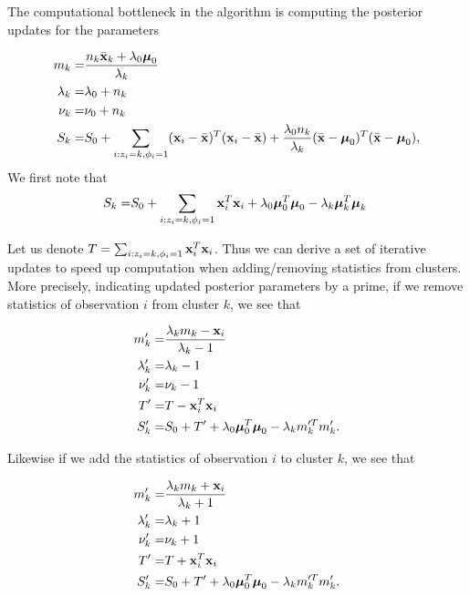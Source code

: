 \documentclass[12pt,english]{article}\usepackage[]{graphicx}\usepackage[]{color}
\begin{document}
The computational bottleneck in the algorithm is computing the
posterior updates for the parameters

\begin{equation}
\begin{split}
m_k = & \frac{n_k\bar{{\bf x}}_k + \lambda_0 \boldsymbol{\mu}_0}{\lambda_k}\\
\lambda_k = & \lambda_0 + n_k\\
\nu_k = & \nu_0 + n_k \\
S_k = & S_0 + \sum_{i:z_i = k, \phi_i = 1}({\bf x}_i - \bar{{\bf x}})^{T}({\bf x}_i - \bar{{\bf x}}) + \frac{\lambda_0n_k}{\lambda_k}(\bar{{\bf x}}- \boldsymbol{\mu}_0)^T(\bar{{\bf x}} - \boldsymbol{\mu}_0), \\
\end{split}
\end{equation}
We first note that
\begin{equation}
\begin{split}
S_k = & S_0 + \sum_{i:z_i = k, \phi_i = 1}{\bf x}_i^{T}{\bf x}_i + \lambda_0\boldsymbol{\mu}_0^T\boldsymbol{\mu}_0 - \lambda_k\boldsymbol{\mu}_k^T \boldsymbol{\mu}_k \ \\
\end{split}
\end{equation}

Let us denote
$T = \sum_{i:z_i = k, \phi_i = 1}{\bf x}_i^{T}{\bf x}_i$. Thus we can
derive a set of iterative updates to speed up computation when
adding/removing statistics from clusters. More precisely, indicating
updated posterior parameters by a prime, if we remove statistics of
observation $i$ from cluster $k$, we see that

\begin{equation}
\begin{split}
m'_k = & \frac{\lambda_k m_k - {\bf x}_i}{\lambda_k - 1}\\
\lambda'_k = & \lambda_k -1\\
\nu'_k = & \nu_k -1  \\
T' = & T - {\bf x}_i^T{\bf x}_i \\
S'_k = & S_0 + T' + \lambda_0\boldsymbol{\mu}_0^T\boldsymbol{\mu}_0 - \lambda_km_k'^T m_k'. \\
\end{split}
\end{equation}

Likewise if we add the statistics of observation $i$ to cluster $k$,
we see that

\begin{equation}
\begin{split}
m'_k = & \frac{\lambda_k m_k + {\bf x}_i}{\lambda_k + 1}\\
\lambda'_k = & \lambda_k +1\\
\nu'_k = & \nu_k +1  \\
T' = & T + {\bf x}_i^T{\bf x}_i \\
S'_k = & S_0 + T' + \lambda_0\boldsymbol{\mu}_0^T\boldsymbol{\mu}_0 - \lambda_km_k'^T m_k'.\\
\end{split}
\end{equation}
\end{document}

